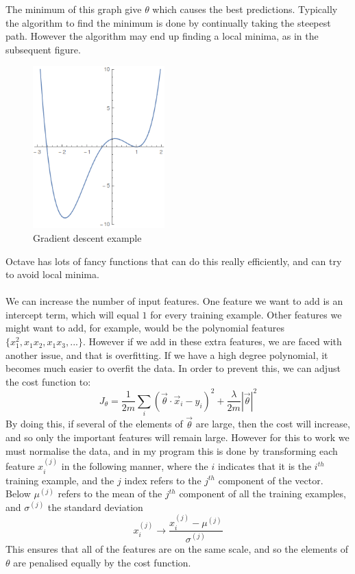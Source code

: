 \documentclass[a4paper,12pt]{report}
\begin{document}
The minimum of this graph give $\theta$ which causes the best predictions. 
Typically the algorithm to find the minimum is done by continually taking the steepest path. However the algorithm may end up finding a local minima, as in the subsequent figure. 
\begin{figure}[h]
\centering
\includegraphics[width=2in]{localmin}
\caption{Gradient descent example}
\label{corr} 
\end{figure}
Octave has lots of fancy functions that can do this really efficiently, and can try to avoid local minima.
\\\\
We can increase the number of input features. One feature we want to add is an intercept term, which will equal $1$ for every training example. Other features we might want to add, for example, would be the polynomial features $\{x_1^2,x_1x_2,x_1x_3, ... \}$. However if we add in these extra features, we are faced with another issue, and that is overfitting. If we have a high degree polynomial, it becomes much easier to overfit the data. In order to prevent this, we can adjust the cost function to:
$$J_\theta = \frac{1}{2m}\sum_i \left(\vec\theta\cdot \vec x_i -y_i\right)^2 +\frac{\lambda}{2m} |\vec\theta|^2$$
By doing this, if several of the elements of $\vec \theta$ are large, then the cost will increase, and so only the important features will remain large. However for this to work we must normalise the data, and in my program this is done by transforming each feature $x_i^{(j)}$  in the following manner, where the $i$ indicates that it is the $i^{th}$ training example, and the $j$ index refers to the $j^{th}$ component of the vector. Below $\mu^{(j)}$ refers to the mean of the $j^{th}$ component of all the training examples, and $\sigma^{(j)}$ the standard deviation
$$x_i^{(j)}\rightarrow \frac{x_i^{(j)}-\mu^{(j)}}{\sigma^{(j)}}$$
This ensures that all of the features are on the same scale, and so the elements of $\theta$ are penalised equally by the cost function. 
\end{document}
